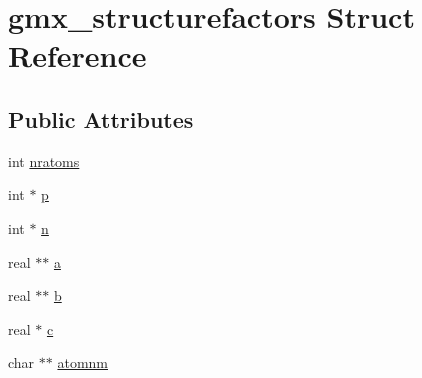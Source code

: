 \hypertarget{structgmx__structurefactors}{\section{gmx\-\_\-structurefactors \-Struct \-Reference}
\label{structgmx__structurefactors}
}
\subsection*{\-Public \-Attributes}
\begin{DoxyCompactItemize}
\item 
int \hyperlink{structgmx__structurefactors_a9be28e731045287fcdd7df2180660386}{nratoms}
\item 
int $\ast$ \hyperlink{structgmx__structurefactors_ac14c3f98a9135147f69efcef7b70018d}{p}
\item 
int $\ast$ \hyperlink{structgmx__structurefactors_ae3ead10feeea38b1500439085c355334}{n}
\item 
real $\ast$$\ast$ \hyperlink{structgmx__structurefactors_aa8fae8511c50bb2579d7b3fbc6ca5fc4}{a}
\item 
real $\ast$$\ast$ \hyperlink{structgmx__structurefactors_aac02f53974f8d243aafe0aa86e4f7ca9}{b}
\item 
real $\ast$ \hyperlink{structgmx__structurefactors_a04225b7f6882ebc9ba224abd73886287}{c}
\item 
char $\ast$$\ast$ \hyperlink{structgmx__structurefactors_a7b468ac2f6417c96ced63d39c9237476}{atomnm}
\end{DoxyCompactItemize}


